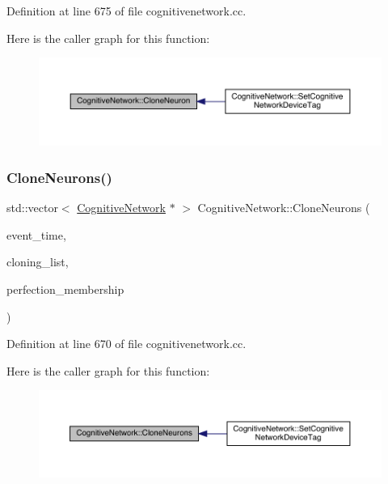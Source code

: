 Definition at line 675 of file cognitivenetwork.\+cc.

Here is the caller graph for this function\+:
\nopagebreak
\begin{figure}[H]
\begin{center}
\leavevmode
\includegraphics[width=350pt]{class_cognitive_network_abf42d64965d64836d6fcbd7ce33c8db4_icgraph}
\end{center}
\end{figure}
\mbox{\label{class_cognitive_network_a8852409e92434523ddbd48d699c5609f}} 
\subsubsection{\texorpdfstring{Clone\+Neurons()}{CloneNeurons()}}
{\footnotesize\ttfamily std\+::vector$<$ \hyperlink{class_cognitive_network}{Cognitive\+Network} $\ast$ $>$ Cognitive\+Network\+::\+Clone\+Neurons (\begin{DoxyParamCaption}\item[{std\+::chrono\+::time\+\_\+point$<$ \hyperlink{universe_8h_a0ef8d951d1ca5ab3cfaf7ab4c7a6fd80}{Clock} $>$}]{event\+\_\+time,  }\item[{std\+::vector$<$ \hyperlink{class_cognitive_network}{Cognitive\+Network} $\ast$$>$}]{cloning\+\_\+list,  }\item[{double}]{perfection\+\_\+membership }\end{DoxyParamCaption})}



Definition at line 670 of file cognitivenetwork.\+cc.

Here is the caller graph for this function\+:
\nopagebreak
\begin{figure}[H]
\begin{center}
\leavevmode
\includegraphics[width=350pt]{class_cognitive_network_a8852409e92434523ddbd48d699c5609f_icgraph}
\end{center}
\end{figure}
\mbox{\label{class_cognitive_network_af78d31471a121844e4735d809c900502}} 
